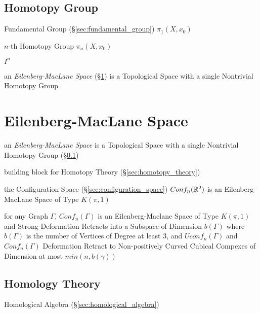 \subsection{Homotopy Group}\label{sec:homotopy_group}

Fundamental Group (\S\ref{sec:fundamental_group}) $\pi_1(X,x_0)$

$n$-th Homotopy Group $\pi_n(X,x_0)$

$I^n$

an \emph{Eilenberg-MacLane Space} (\S\ref{sec:eilenberg_maclane_space}) is a
Topological Space with a single Nontrivial Homotopy Group



\section{Eilenberg-MacLane Space}\label{sec:eilenberg_maclane_space}

an \emph{Eilenberg-MacLane Space} is a Topological Space with a single
Nontrivial Homotopy Group (\S\ref{sec:homotopy_group})

building block for Homotopy Theory (\S\ref{sec:homotopy_theory})

the Configuration Space (\S\ref{sec:configuration_space}) $Conf_n(\mathbb{R}^2)$
is an Eilenberg-MacLane Space of Type $K(\pi,1)$

for any Graph $\Gamma$, $Conf_n(\Gamma)$ is an Eilenberg-Maclane Space of Type
$K(\pi,1)$ and Strong Deformation Retracts into a Subspace of Dimension
$b(\Gamma)$ where $b(\Gamma)$ is the number of Vertices of Degree at least 3,
and $Uconf_n(\Gamma)$ and $Conf_n(\Gamma)$ Deformation Retract to
Non-positively Curved Cubical Compexes of Dimension at most $min(n,b(\gamma))$



\subsection{Homology Theory}\label{sec:homology_theory}

Homological Algebra (\S\ref{sec:homological_algebra})



